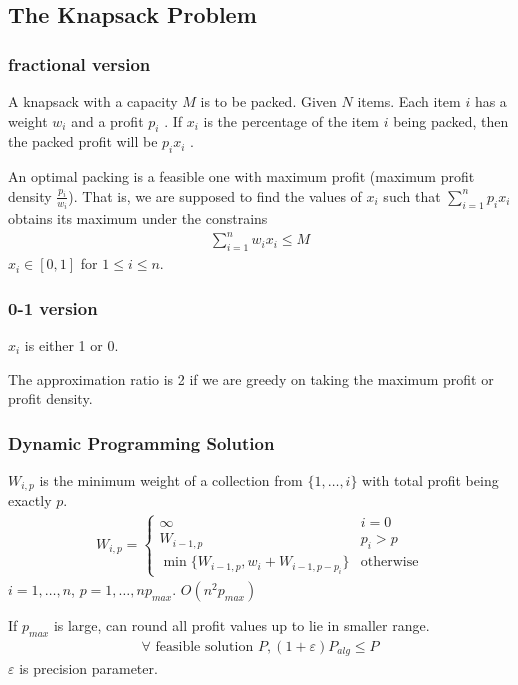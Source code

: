 \subsection{The Knapsack Problem}
\subsubsection{fractional version}
A knapsack with a capacity  $M$  is to be packed.  Given $N$ items.  Each item  $i$  has a weight  $w_i$  and a profit  $p_i$ .  If  $x_i$ is the percentage of the item $i$  being packed,  then the packed profit will be  $p_i x_i$ .

An optimal packing is a feasible one with maximum profit (maximum profit density $\frac{p_i}{w_i}$).  That is,  we are supposed to find the values of $x_i$  such that $\displaystyle \sum_{i=1}^np_i x_i$ obtains its maximum under the constrains
\begin{align*}
    \sum_{i=1}^n w_i x_i \le M
\end{align*}
$x_i\in[0,1]$ for $1\le i\le n$. 


\subsubsection{0-1 version}
$x_i$ is either 1 or 0. 

The approximation ratio is 2 if we are greedy on taking the maximum profit or profit density. 

\subsubsection{Dynamic Programming Solution}
$W_{i, p}$ is the minimum weight of a collection from $\{1, \dots, i \}$ with total profit being  exactly $p$. 
\begin{align*}
    W_{i,p}=\left\{ \begin{array}{ll}
        \infty & i=0\\
        W_{i-1, p} & p_i>p\\
        \min\{ W_{i-1, p}, w_i+W_{i-1, p-p_i} \} & \text{otherwise}
    \end{array} \right.
\end{align*}
$i=1,\dots,n$, $p=1,\dots,np_{max}$. $O(n^2 p_{max})$

If $p_{max}$ is large, can round all profit values up to lie in smaller range. 
\begin{align*}
    \forall \text{ feasible solution }P, (1+\varepsilon)P_{alg}\le P
\end{align*}
$\varepsilon$ is precision parameter. 


